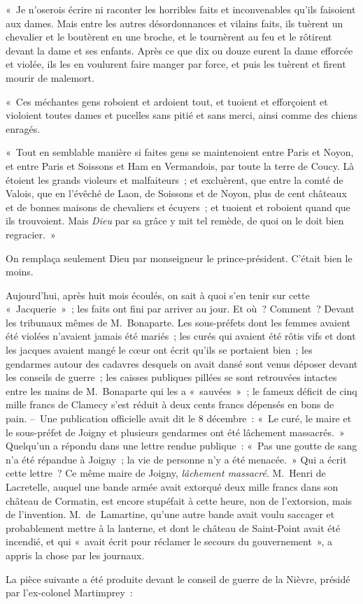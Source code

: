 \documentclass[french,twoside]{book} %
\newenvironment{quoteblock}%
  {\begin{quoting}}
  {\end{quoting}}
\newenvironment{quotebar}{%
    \def\FrameCommand{{\color{rubric!10!}\vrule width 0.5em} \hspace{0.9em}}%
    \def\OuterFrameSep{\itemsep} %
    \MakeFramed {\advance\hsize-\width \FrameRestore}
  }%
  {%
    \endMakeFramed
  }
\renewenvironment{quoteblock}%
  {%
    \savenotes
    \setstretch{0.9}
    \normalfont
    \begin{quotebar}
  }
  {%
    \end{quotebar}
    \spewnotes
  }
\begin{document}
\begin{quoteblock}
 \noindent « Je n’oserois écrire ni raconter les horribles faits et inconvenables qu’ils faisoient aux dames. Mais entre les autres désordonnances et vilains faits, ils tuèrent un chevalier et le boutèrent en une broche, et le tournèrent au feu et le rôtirent devant la dame et ses enfants. Après ce que dix ou douze eurent la dame efforcée et violée, ils les en voulurent faire manger par force, et puis les tuèrent et firent mourir de malemort.\par
 « Ces méchantes gens roboient et ardoient tout, et tuoient et efforçoient et violoient toutes dames et pucelles sans pitié et sans merci, ainsi comme des chiens enragés.\par
 « Tout en semblable manière si faites gens se maintenoient entre Paris et Noyon, et entre Paris et Soissons et Ham en Vermandois, par toute la terre de Coucy. Là étoient les grands violeurs et malfaiteurs ; et excluèrent, que entre la comté de Valois, que en l’évêché de Laon, de Soissons et de Noyon, plus de cent châteaux et de bonnes maisons de chevaliers et écuyers ; et tuoient et roboient quand que ils trouvoient. Mais \emph{Dieu} par sa grâce y mit tel remède, de quoi on le doit bien regracier. »
 \end{quoteblock}

\noindent On remplaça seulement Dieu par monseigneur le prince-président. C’était bien le moins.\par
Aujourd’hui, après huit mois écoulés, on sait à quoi s’en tenir sur cette « Jacquerie » ; les faits ont fini par arriver au jour. Et où ? Comment ? Devant les tribunaux mêmes de M. Bonaparte. Les sous-préfets dont les femmes avaient été violées n’avaient jamais été mariés ; les curés qui avaient été rôtis vifs et dont les jacques avaient mangé le cœur ont écrit qu’ils se portaient bien ; les gendarmes autour des cadavres desquels on avait dansé sont venus déposer devant les conseils de guerre ; les caisses publiques pillées se sont retrouvées intactes entre les mains de M. Bonaparte qui les a « sauvées » ; le fameux déficit de cinq mille francs de Clamecy s’est réduit à deux cents francs dépensés en bons de pain. – Une publication officielle avait dit le 8 décembre : « Le curé, le maire et le sous-préfet de Joigny et plusieurs gendarmes ont été lâchement massacrés. » Quelqu’un a répondu dans une lettre rendue publique : « Pas une goutte de sang n’a été répandue à Joigny ; la vie de personne n’y a été menacée. » Qui a écrit cette lettre ? Ce même maire de Joigny, \emph{lâchement massacré}. M. Henri de Lacretelle, auquel une bande armée avait extorqué deux mille francs dans son château de Cormatin, est encore stupéfait à cette heure, non de l’extorsion, mais de l’invention. M. de Lamartine, qu’une autre bande avait voulu saccager et probablement mettre à la lanterne, et dont le château de Saint-Point avait été incendié, et qui « avait écrit pour réclamer le secours du gouvernement », a appris la chose par les journaux.\par
La pièce suivante a été produite devant le conseil de guerre de la Nièvre, présidé par l’ex-colonel Martimprey :\par
\end{document}
